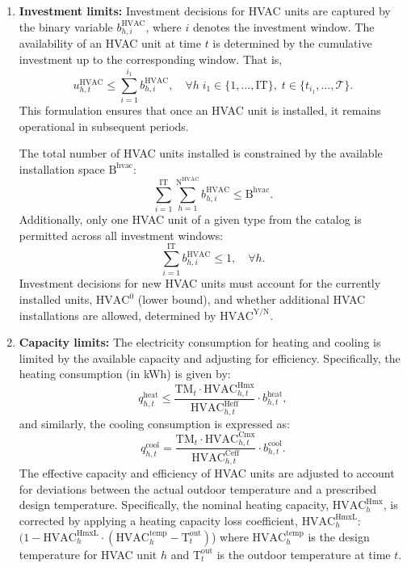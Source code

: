 \documentclass[11pt]{article}
\begin{document}
\begin{enumerate}
    \item \textbf{Investment limits:}  
    Investment decisions for HVAC units are captured by the binary variable \(b^\text{HVAC}_{h,i}\), where \(i\) denotes the investment window. The availability of an HVAC unit at time \(t\) is determined by the cumulative investment up to the corresponding window. That is,
    \[
    u^\text{HVAC}_{h,t} \leq \sum_{i=1}^{i_1} b^\text{HVAC}_{h,i}, \quad \forall h\; i_1 \in \{1, \dots, \text{IT}\}, \; t \in \{t_{i_1}, \dots, \mathcal{T}\}.
    \]
    This formulation ensures that once an HVAC unit is installed, it remains operational in subsequent periods.

    The total number of HVAC units installed is constrained by the available installation space \(\text{B}^\text{hvac}\):
    \[
    \sum_{i=1}^{\text{IT}} \sum_{h=1}^{\text{N}^\text{HVAC}} b^\text{HVAC}_{h,i} \leq \text{B}^\text{hvac}.
    \]
    Additionally, only one HVAC unit of a given type from the catalog is permitted across all investment windows:
    \[
    \sum_{i=1}^{\text{IT}} b^\text{HVAC}_{h,i} \leq 1, \quad \forall h.
    \]
    Investment decisions for new HVAC units must account for the currently installed units, \(\text{HVAC}^\text{0}\) (lower bound), and whether additional HVAC installations are allowed, determined by \(\text{HVAC}^\text{Y/N}\).
    
    \item \textbf{Capacity limits:}  
    The electricity consumption for heating and cooling is limited by the available capacity and adjusting for efficiency. Specifically, the heating consumption (in kWh) is given by:
    \[
    q^\text{heat}_{h,t} \leq \frac{\text{TM}_t \cdot \text{HVAC}^\text{Hmx}_{h,t}}{\text{HVAC}^\text{Heff}_{h,t}} \cdot b^\text{heat}_{h,t},
    \]
    and similarly, the cooling consumption is expressed as:
    \[
    q^\text{cool}_{h,t} = \frac{\text{TM}_t \cdot \text{HVAC}^\text{Cmx}_{h,t}}{\text{HVAC}^\text{Ceff}_{h,t}}  \cdot b^\text{cool}_{h,t}.
    \]
    The effective capacity and efficiency of HVAC units are adjusted to account for deviations between the actual outdoor temperature and a prescribed design temperature. Specifically, the nominal heating capacity, \(\text{HVAC}^\text{Hmx}_h\), is corrected by applying a heating capacity loss coefficient, \(\text{HVAC}^\text{HmxL}_h\): \((1 - \text{HVAC}^\text{HmxL}_h \cdot (\text{HVAC}^\text{temp}_h - \text{T}^\text{out}_t)\)) where \(\text{HVAC}^\text{temp}_h\) is the design temperature for HVAC unit \(h\) and \(\text{T}^\text{out}_t\) is the outdoor temperature at time \(t\).
    

\end{enumerate}
\end{document}
